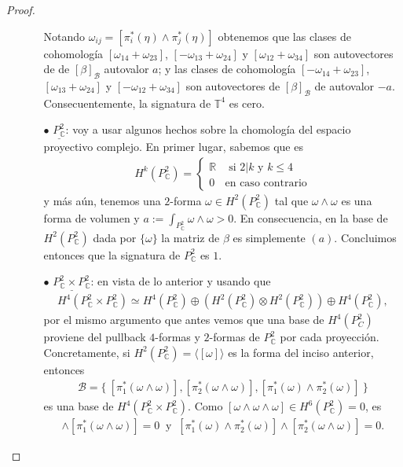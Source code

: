 \documentclass[11pt]{article}
\newcommand{\R}{\mathbb{R}}
\newcommand{\C}{\mathbb{C}}
\newcommand{\T}{\mathbb{T}}
\newcommand{\ip}[1]{\langle #1 \rangle}
\begin{document}
\begin{proof}
\begin{itemize}[listparindent = \parindent]
\begin{itemize}[listparindent = \parindent]
Notando $\omega_{ij} = [\pi_i^*(\eta) \wedge \pi_j^*(\eta)]$ obtenemos que las clases de cohomología $[\omega_{14} + \omega_{23}]$, $[-\omega_{13}+\omega_{24}]$ y $[\omega_{12} + \omega_{34}]$ son autovectores de de $[\beta]_{\mathscr{B}}$ autovalor $a$; y las clases de cohomología $[-\omega_{14} + \omega_{23}]$, $[\omega_{13}+\omega_{24}]$ y $[-\omega_{12} + \omega_{34}]$ son autovectores de $[\beta]_{\mathscr{B}}$ de autovalor $-a$. Consecuentemente, la signatura de $\T^4$ es cero.
\item[$\bullet$] $\underline{P_\C^2}$: voy a usar algunos hechos sobre la chomología del espacio proyectivo complejo. En primer lugar, sabemos que es
\begin{align*}
H^{k}(P_\C^2) = \begin{cases}\R &\text{ si $2 | k$ y $k \leq 4$}\\0 &\text{en caso contrario}\end{cases}
\end{align*}
y más aún, tenemos una $2$-forma $\omega \in H^2(P_\C^2)$ tal que $\omega \wedge \omega$ es una forma de volumen y $a := \int_{P_\C^2}\omega \wedge \omega > 0$. En consecuencia, en la base de $H^2(P_\C^2)$ dada por $\{\omega\}$ la matriz de $\beta$ es simplemente $(a)$. Concluimos entonces que la signatura de $P_\C^2$ es $1$.
\item[$\bullet$] $\underline{P_\C^2 \times P_\C^2}$: en vista de lo anterior y usando que
\begin{align*}
H^4(P_\C^2 \times P_\C^2) \simeq H^4(P_\C^2) \oplus (H^2(P_\C^2) \otimes H^2(P_\C^2)) \oplus H^4(P_\C^2),
\end{align*}
por el mismo argumento que antes vemos que una base de $H^4(P_C^2)$ proviene del pullback $4$-formas y $2$-formas de $P_\C^2$ por cada proyección. Concretamente, si $H^2(P_\C^2) = \ip{[\omega]}$ es la forma del inciso anterior, entonces
\begin{align*}
\mathscr{B}= \{\ [\pi_1^*(\omega \wedge \omega)], [\pi_2^*(\omega \wedge \omega)], [\pi_1^*(\omega) \wedge \pi_2^*(\omega)] \ \}
\end{align*}
es una base de $H^4(P_\C^2 \times P_\C^2)$. Como $[\omega \wedge \omega \wedge \omega] \in H^6(P_\C^2) = 0$, es
\begin{align*}
[\pi_1^*(\omega) \wedge \pi_2^*(\omega)] \wedge [\pi_1^*(\omega \wedge \omega)] = 0 \ \text{ y } \ [\pi_1^*(\omega) \wedge \pi_2^*(\omega)] \wedge [\pi_2^*(\omega \wedge \omega)] = 0.
\end{align*}


\end{itemize}
\end{itemize}
\end{proof}
\end{document}
